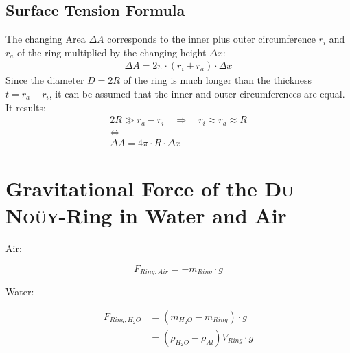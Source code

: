         \subsection*{Surface Tension Formula}\label{sec:A2 derive eq.4}%
            The changing Area $ \Delta A $ corresponds to the inner plus outer circumference $ r_i $ and $ r_a $ of
            the ring multiplied by the changing height $ \Delta x $:
            \begin{align}
                \Delta A = 2\pi \cdot (r_i + r_a) \cdot \Delta x
            \end{align}
            Since the diameter $ D = 2R $ of the ring is much longer than the thickness $ t = r_a - r_i $, it can be assumed
            that the inner and outer circumferences are equal. It results:
            \begin{equation}
                \begin{gathered}
                    2R \gg r_a-r_i \quad \Rightarrow \quad r_i \approx r_a \approx R \\
                    \Leftrightarrow \\
                    \Delta A = 4\pi \cdot R \cdot \Delta x
                \end{gathered}
            \end{equation}
        \section{Gravitational Force of the \textsc{Du Noüy}-Ring in Water and Air}\label{sec:A3 gravi force of du noüy ring}%
        Air:

        \begin{equation}
            F_{Ring,Air} = -m_{Ring} \cdot g
        \end{equation}

        Water:

        \begin{align}
            F_{Ring,H_2O}  &= \left( m_{H_2O} - m_{Ring}\right) \cdot g \nonumber \\
                            &= \left(\rho_{H_2O} - \rho_{Al}\right)V_{Ring} \cdot g
        \end{align}
